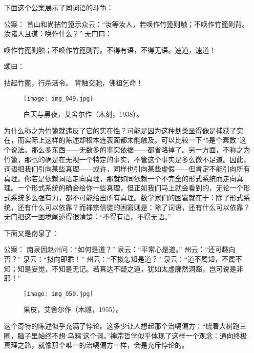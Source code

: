 下面这个公案展示了同词语的斗争：

\begin{zenkoan}
公案：
首山和尚拈竹篦示众云：“汝等汝人，若唤作竹篦则触；不唤作竹篦则背。汝诸人且道：唤作什么？”
无门曰：
\begin{zenkoan}
唤作竹篦则触；不唤作竹篦则背。不得有语，不得无语。速道，速道！
\end{zenkoan}
颂曰：
\begin{zenkoan}
拈起竹篦，行杀活令。
背触交驰，佛祖乞命！
\end{zenkoan}
\end{zenkoan}

\begin{figure}
\texttt{[image: img\_049.jpg]}
\caption[白天与黑夜，艾舍尔作。]
  {白天与黑夜，艾舍尔作（木刻，1938）。}
\end{figure}

为什么称之为竹篦就违反了它的实在性？可能是因为这种划类显得像是捕获了实在，而实际上这样的陈述却根本连表面都未能触及。可以比较一下“5是个素数”这个说法。那么多东西——无数多的事实依据——都省略掉了。另一方面，不称之为竹篦，那也的确是在无视一个特定的事实，不管这个事实是多么微不足道。因此，词语把我们引向某些真理——或许，同样也引向某些虚假——但肯定不能引向所有真理。你若是依赖词语走向真理，那就如同依赖一个不完全的形式系统而走向真理。一个形式系统的确会给你一些真理，但正如我们马上就会看到的，无论一个形式系统多么强有力，都不可能给出所有真理。数学家们的困窘就在于：除了形式系统，还有什么可以依靠？而禅宗信徒的困窘则是：除了词语，还有什么可以依靠？无门把这一困境阐述得很清楚：“不得有语，不得无语。”

下面又是南泉了：

\begin{zenkoan}
公案：
南泉因赵州问：“如何是道？”
泉云：“平常心是道。”
州云：“还可趣向否？”
泉云：“拟向即乖！”
州云：“不拟怎知是道？”
泉云：“道不属知，不属不知；知是妄觉，不知是无记。若真达不疑之道，犹如太虚廓然洞豁，岂可说是非耶！”\lnote{[见\fig{50}]}
\end{zenkoan}

\begin{figure}
\texttt{[image: img\_050.jpg]}
\caption[果皮，艾舍尔作。]
  {果皮，艾舍尔作（木雕，1955）。}
\end{figure}

这个奇特的陈述似乎充满了悖论。这多少让人想起那个治嗝偏方：“绕着大树跑三圈，脑子里始终不想‘乌鸦’这个词。”禅宗哲学似乎体现了这样一个观念：通向终极真理之路，就像那个唯一的治嗝偏方一样，会是充斥悖论的。

